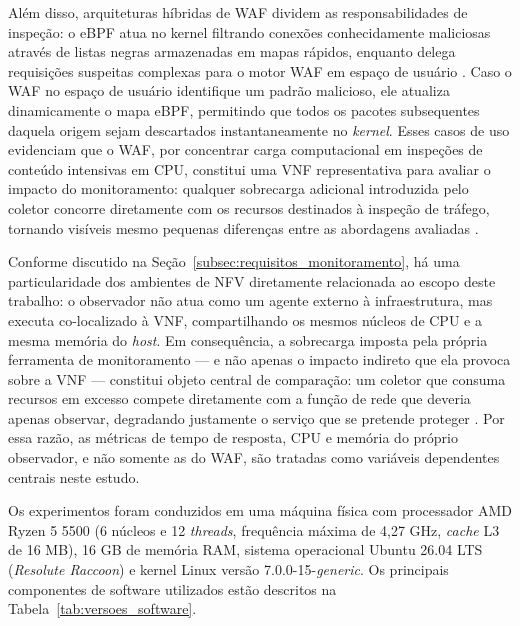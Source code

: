 Além disso, arquiteturas híbridas de WAF dividem as responsabilidades de inspeção: o eBPF atua no kernel filtrando conexões conhecidamente maliciosas através de listas negras armazenadas em mapas rápidos, enquanto delega requisições suspeitas complexas para o motor WAF em espaço de usuário \cite{hybridvnf2017}. Caso o WAF no espaço de usuário identifique um padrão malicioso, ele atualiza dinamicamente o mapa eBPF, permitindo que todos os pacotes subsequentes daquela origem sejam descartados instantaneamente no \textit{kernel}. Esses casos de uso evidenciam que o WAF, por concentrar carga computacional em inspeções de conteúdo intensivas em CPU, constitui uma VNF representativa para avaliar o impacto do monitoramento: qualquer sobrecarga adicional introduzida pelo coletor concorre diretamente com os recursos destinados à inspeção de tráfego, tornando visíveis mesmo pequenas diferenças entre as abordagens avaliadas \cite{10.1145/3397022}.

Conforme discutido na Seção~\ref{subsec:requisitos_monitoramento}, há uma particularidade dos ambientes de NFV diretamente relacionada ao escopo deste trabalho: o observador não atua como um agente externo à infraestrutura, mas executa co-localizado à VNF, compartilhando os mesmos núcleos de CPU e a mesma memória do \textit{host}. Em consequência, a sobrecarga imposta pela própria ferramenta de monitoramento --- e não apenas o impacto indireto que ela provoca sobre a VNF --- constitui objeto central de comparação: um coletor que consuma recursos em excesso compete diretamente com a função de rede que deveria apenas observar, degradando justamente o serviço que se pretende proteger \cite{10.1145/3397022}. Por essa razão, as métricas de tempo de resposta, CPU e memória do próprio observador, e não somente as do WAF, são tratadas como variáveis dependentes centrais neste estudo.

Os experimentos foram conduzidos em uma máquina física com processador AMD Ryzen 5 5500 (6 núcleos e 12 \textit{threads}, frequência máxima de 4,27 GHz, \textit{cache} L3 de 16 MB), 16 GB de memória RAM, sistema operacional Ubuntu 26.04 LTS (\textit{Resolute Raccoon}) e kernel Linux versão 7.0.0-15-\textit{generic}. Os principais componentes de software utilizados estão descritos na Tabela~\ref{tab:versoes_software}.

